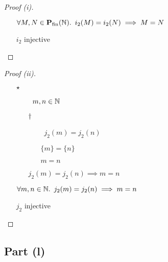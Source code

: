 \begin{prop}
\begin{proof}[Proof (i)]
\begin{itemize}
        \item[\imps]
          $\forall M, N\in\mathbf{P}_{\operatorname{fin}}(\mathbb{N})\ldotp~i_2(M) = i_2(N) \implies M = N$
          \marginnote{$\forall$-\Intro-$\star$}

        \item[\iffs]
          $i_2$ injective
          \qedhere
    \end{itemize}
  \end{proof}

  \begin{proof}[Proof (ii)]~\\
    \begin{itemize}
      \item[$\star$]
        \begin{itemize}
          \item[\phs]\Let~$m,n\in\mathbb{N}$
            \marginnote{\Hyp}

          \item[$\dagger$]
            \begin{itemize}
              \item[\phantom{\imps}]\Ass~$j_2(m) = j_2(n)$
                \marginnote{\Hyp}

              \item[\iffs]
                $\{m\} = \{n\}$

              \item[\iffs] $m = n$
            \end{itemize}
            \item[\imps]
              $j_2(m) = j_2(n) \implies m = n$
              \marginnote{\imps-\Intro-$\dagger$}
        \end{itemize}

        \item[\imps]
          $\forall m,n\in\mathbb{N}\ldotp~j_2(m) = j_2(n) \implies m = n$
          \marginnote{$\forall$-\Intro-$\star$}

        \item[\iffs]
          $j_2$ injective
          \qedhere
    \end{itemize}
  \end{proof}
\end{prop}

\subsection{Part (l)}\label{sec:q-2-l}

